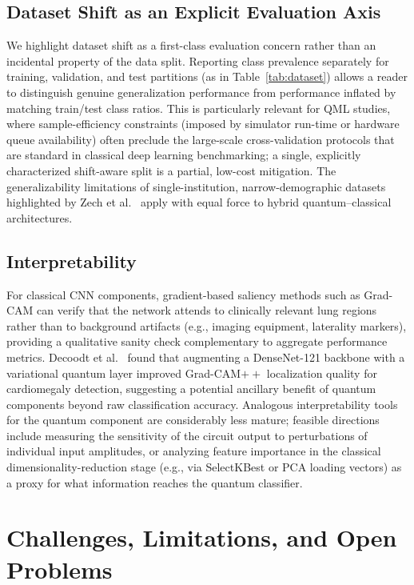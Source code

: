 \documentclass[11pt,a4paper]{article}
\begin{document}
\subsection{Dataset Shift as an Explicit Evaluation Axis}

We highlight dataset shift as a first-class evaluation concern rather than
an incidental property of the data split.  Reporting class prevalence
separately for training, validation, and test partitions (as in
Table~\ref{tab:dataset}) allows a reader to distinguish genuine
generalization performance from performance inflated by matching train/test
class ratios.  This is particularly relevant for QML studies, where
sample-efficiency constraints (imposed by simulator run-time or hardware queue
availability) often preclude the large-scale cross-validation protocols that
are standard in classical deep learning benchmarking; a single, explicitly
characterized shift-aware split is a partial, low-cost mitigation.  The
generalizability limitations of single-institution, narrow-demographic datasets
highlighted by Zech et al.~\cite{zech2018} apply with equal force to hybrid
quantum--classical architectures.

\subsection{Interpretability}

For classical CNN components, gradient-based saliency methods such as Grad-CAM
can verify that the network attends to clinically relevant lung regions rather
than to background artifacts (e.g., imaging equipment, laterality markers),
providing a qualitative sanity check complementary to aggregate performance
metrics.  Decoodt et al.~\cite{decoodt2023} found that augmenting a
DenseNet-121 backbone with a variational quantum layer improved
Grad-CAM$++$ localization quality for cardiomegaly detection, suggesting a
potential ancillary benefit of quantum components beyond raw classification
accuracy.  Analogous interpretability tools for the quantum component are
considerably less mature; feasible directions include measuring the sensitivity
of the circuit output to perturbations of individual input amplitudes, or
analyzing feature importance in the classical dimensionality-reduction stage
(e.g., via SelectKBest or PCA loading vectors) as a proxy for what information
reaches the quantum classifier.

\section{Challenges, Limitations, and Open Problems}
\label{sec:limitations}
\end{document}
